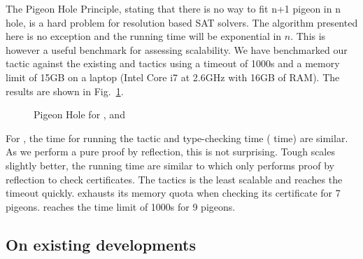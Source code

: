 \documentclass[a4paper,UKenglish,cleveref, autoref, thm-restate]{lipics-v2019}
\begin{document}
The Pigeon Hole Principle, stating that there is no way to fit n+1
pigeon in n hole, is a hard problem for resolution based SAT solvers.
%
The algorithm presented here is no exception and the running time will
be exponential in $n$. This is however a useful benchmark for
assessing scalability. We have benchmarked our  tactic
against the existing  and  tactics using a
timeout of 1000s and a memory limit of 15GB on a laptop (Intel Core i7
at 2.6GHz with 16GB of RAM).
%
The results are shown in Fig.~\ref{fig:pigeon}.
\begin{figure}
  \centering
  \qquad
  \caption{Pigeon Hole for ,  and }
  \label{fig:pigeon}
\end{figure}
For , the time for running the tactic and type-checking
time ( time) are similar.  As we perform a pure proof by
reflection, this is not surprising.  Tough  scales
slightly better, the running time are similar to  which
only performs proof by reflection to check certificates.
%
The tactics  is the least scalable and reaches the timeout quickly.
%
 exhausts its memory quota when checking its certificate for 7 pigeons.
 reaches the time limit of 1000s for 9 pigeons.

\subsection{On existing developments}
\end{document}
